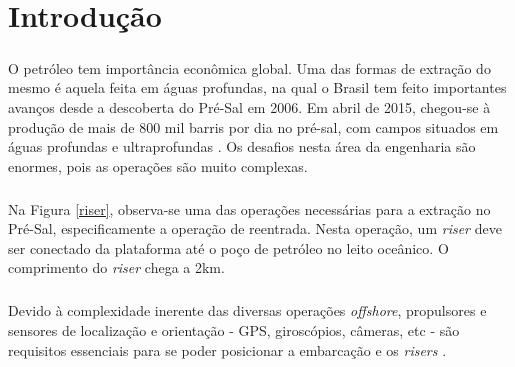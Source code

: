  


\chapter{Introdução}

\label{CapIntro}




\paragraph{} O petróleo tem importância econômica global. Uma das formas de extração do mesmo é aquela feita em águas profundas, na qual o Brasil tem feito importantes avanços desde a descoberta do Pré-Sal em 2006. Em abril de 2015, chegou-se à produção de mais de 800 mil barris por dia no pré-sal, com campos situados em águas profundas e ultraprofundas \cite{preSal}. Os desafios nesta área da engenharia são enormes, pois as operações são muito complexas.

\paragraph{} Na Figura \ref{riser}, observa-se uma das operações necessárias para a extração no Pré-Sal, especificamente a operação de reentrada. Nesta operação, um \textit{riser} deve ser conectado da plataforma até o poço de petróleo no leito oceânico. O comprimento do \textit{riser} chega a 2km.

\paragraph{} Devido à complexidade inerente das diversas operações \textit{offshore}, propulsores e sensores de localização e orientação - GPS, giroscópios, câmeras, etc - são requisitos essenciais para se poder posicionar a embarcação e os \textit{risers} \cite{redytton}.


